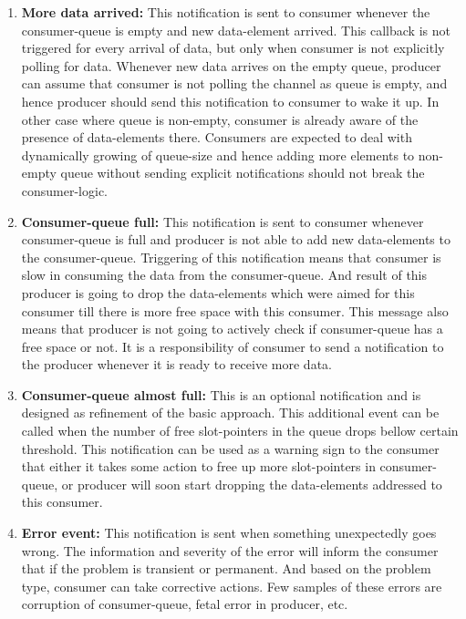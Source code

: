 \documentclass[a4paper,twoside]{report} %
\begin{document}
\begin{enumerate} 
  \item \textbf{More data arrived:} This notification is sent to
  consumer whenever the consumer-queue is empty and new data-element 
  arrived.  This callback is not triggered for every arrival of data,
  but only when consumer is not explicitly polling for data.  Whenever
  new data arrives on the empty queue, producer can assume that
  consumer is not polling the channel as queue is empty, and hence
  producer should send this notification to consumer to wake it up.
  In other case where queue is non-empty, consumer is already aware of
  the presence of data-elements there.  Consumers are expected to
  deal with dynamically growing of queue-size and hence adding
  more elements to non-empty queue without sending explicit
  notifications should not break the consumer-logic.

  \item \textbf{Consumer-queue full:}  This notification is sent to
  consumer whenever consumer-queue is full and producer is not able 
  to add new data-elements to the consumer-queue.  Triggering of this
  notification means that consumer is slow in consuming the data from 
  the consumer-queue. And result of this producer is going to drop 
  the data-elements which were aimed for this consumer till there 
  is more free space with this consumer.  This message also means that
  producer is not going to actively check if consumer-queue has a free
  space or not.  It is a responsibility of consumer to send
  a notification to the producer whenever it is ready to receive more
  data.
 
  \item \textbf{Consumer-queue almost full:} This is an optional
  notification and is designed as refinement of the basic approach.
  This additional event can be 
  called when the number of free slot-pointers in the queue drops bellow
  certain threshold.  This notification can be used as a warning sign
  to the consumer that either it takes some action to free up more
  slot-pointers in consumer-queue, or producer will soon start dropping the
  data-elements addressed to this consumer.

  \item \textbf{Error event:}  This notification is sent when something
  unexpectedly goes wrong.  The information and severity of the error
  will inform the consumer that if the problem is transient or
  permanent.  And based on the problem type, consumer can take
  corrective actions.  Few samples of these errors are corruption of
  consumer-queue, fetal error in producer, etc.


\end{enumerate}
\end{document}
